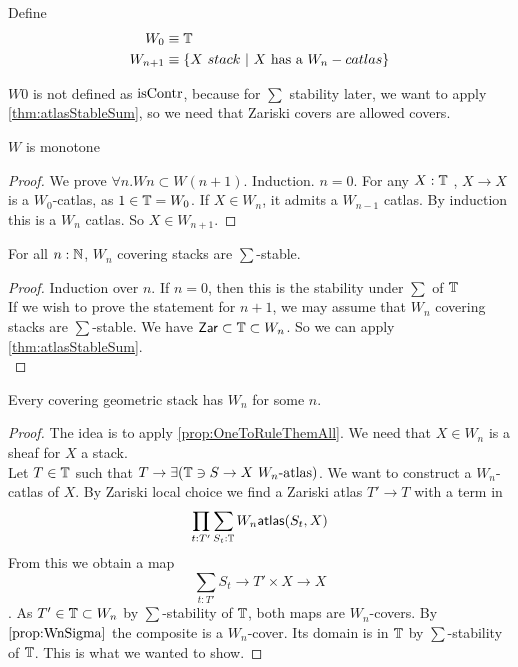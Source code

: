 \begin{definition}
	Define \begin{align*}
		W_0 &\equiv \mathbb{T} \\
		W_{n+1} &\equiv \{X \ stack \ | \  X \text{ has a } W_n-catlas \}
	\end{align*}
\end{definition}
\begin{why}
	$W 0 $ is not defined as $\operatorname{isContr}$, because for $\sum$ stability later, we want to apply \ref{thm:atlasStableSum}, so we need that Zariski covers are allowed covers.
\end{why}
\begin{lemma}
	$W$  is monotone
\end{lemma}
\begin{proof}
	We prove $\forall n . W n \subset W (n+1)$.
	Induction. $n = 0$. For any $X :\mathbb{T}$ , $ X \to X$ is a $W_0$-catlas, as $1 \in \mathbb{T} = W_0$. If $X \in W_n$, it admits a $W_{n-1}$ catlas. By induction this is a $W_n$ catlas. So $X \in W_{n+1}$.
\end{proof}
\begin{lemma}{\label{prop:WnSigma}}
	For all $n : \mathbb{N}$, $W_n$ covering stacks are $\sum$-stable. \\
\end{lemma}
\begin{proof}	
	Induction over $n$. If $n = 0$, then this is the stability under $\sum$ of $\mathbb{T}$ \\
	If we wish to prove the statement for $n+1$, we may assume that $W_n$ covering stacks are $\sum$-stable. We have $\mathsf{Zar} \subset \mathbb{T} \subset W_n$. So we can apply \ref{thm:atlasStableSum}. \\
\end{proof}	
\begin{prop}{\label{prop:WTrunc}}
	Every covering geometric stack has $W_n$ for some $n$.
\end{prop}
\begin{proof}
	The idea is to apply \ref{prop:OneToRuleThemAll}.
	We need that $X \in W_n$ is a sheaf for $X$ a stack. \\
	Let $T \in \mathbb{T}$ such that $T \to \exists (\mathbb{T} \ni S \to X \ W_n \text{-atlas})$. We want to construct a $W_n$-catlas of $X$. By Zariski local choice we find a Zariski atlas $T' \to T$ with a term in 
	\[\prod_{t : T'} \sum_{S_t : \mathbb{T}} W_n \mathsf{atlas} (S_t , X) \]
	 From this we obtain a map 
	 \[\sum_{t : T'} S_t \to T' \times X \to X\].  As $T' \in \mathbb{T} \subset W_n$ by $\sum$-stability of $\mathbb{T}$, both maps are $W_n$-covers. By $\ref{prop:WnSigma}$ the composite is a $W_n$-cover. Its domain is in $\mathbb{T}$ by $\sum$-stability of $\mathbb{T}$. This is what we wanted to show.
\end{proof}

